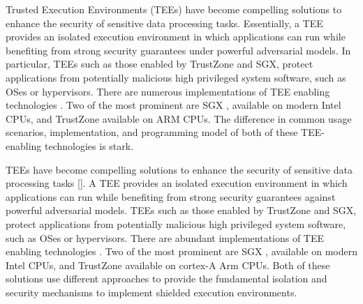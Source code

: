 \fi




Trusted Execution Environments (TEEs) have become compelling solutions to enhance the security of sensitive data processing tasks. Essentially, a TEE provides an isolated execution environment in which applications can run while benefiting from strong security guarantees under powerful adversarial models.  In particular, TEEs such as those enabled by TrustZone and SGX, protect applications from potentially malicious high privileged system software, such as OSes or hypervisors. There are numerous implementations of TEE enabling technologies \cite{AMD2019, intelME2019, titanM2019, TPM2019, VBS2019, SEV2019, multizone2019, Lee2019, intelsgx, armtz}. 
Two of the most prominent are SGX \cite{intelsgx}, available on modern Intel CPUs, and TrustZone \cite{armtz} available on ARM CPUs. The difference in common usage scenarios, implementation, and programming model of both of these TEE-enabling technologies is stark.
\fi 



TEEs have become compelling solutions to enhance the security of sensitive data processing tasks []. 
A TEE provides an isolated execution environment in which applications can run while benefiting from strong security guarantees against powerful adversarial models. 
TEEs such as those enabled by TrustZone and SGX, protect applications from potentially malicious high privileged system software, such as OSes or hypervisors.
There are abundant implementations of TEE enabling technologies \cite{AMD2019, intelME2019, titanM2019, TPM2019, VBS2019, SEV2019, multizone2019, Lee2019, intelsgx, armtz}. 
Two of the most prominent are SGX \cite{intelsgx}, available on modern Intel CPUs, and TrustZone \cite{armtz} available on cortex-A Arm CPUs.
Both of these solutions use different approaches to provide the fundamental isolation and security mechanisms to implement shielded execution environments.

